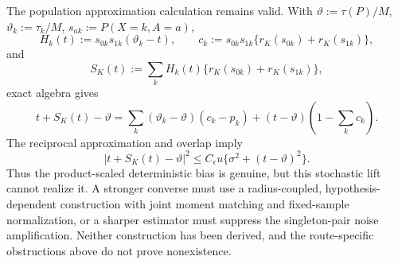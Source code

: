 The population approximation calculation remains valid.  With
\(\vartheta:=\tau(P)/M\), \(\vartheta_k:=\tau_k/M\),
\(s_{ak}:=P(X=k,A=a)\),
\[
 H_k(t):=s_{0k}s_{1k}(\vartheta_k-t),
 \qquad
 c_k:=s_{0k}s_{1k}\{r_K(s_{0k})+r_K(s_{1k})\},
\]
and
\[
 S_K(t):=\sum_kH_k(t)\{r_K(s_{0k})+r_K(s_{1k})\},
\]
exact algebra gives
\[
 t+S_K(t)-\vartheta
 =\sum_k(\vartheta_k-\vartheta)(c_k-p_k)
 +(t-\vartheta)\left(1-\sum_kc_k\right).
\tag{7}
\]
The reciprocal approximation and overlap imply
\[
 |t+S_K(t)-\vartheta|^2
 \le C_{\epsilon}u\{\sigma^2+(t-\vartheta)^2\}.
\tag{8}
\]
Thus the product-scaled deterministic bias is genuine, but this stochastic
lift cannot realize it.  A stronger converse must use a radius-coupled,
hypothesis-dependent construction with joint moment matching and
fixed-sample normalization, or a sharper estimator must suppress the
singleton-pair noise amplification.  Neither construction has been derived,
and the route-specific obstructions above do not prove nonexistence.